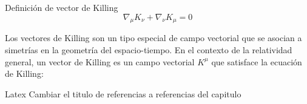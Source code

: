 \begin{definition}{Definición de vector de Killing}{}
      \begin{equation}
        \nabla_\mu K_\nu + \nabla_\nu K_\mu = 0
      \end{equation}
\end{definition}

Los vectores de Killing son un tipo especial de campo vectorial que se asocian a simetrías en la geometría del espacio-tiempo. En el contexto de la relatividad general, un vector de Killing es un campo vectorial $K^\mu$ que satisface la ecuación de Killing:







\printbibliography[keyword={BlackHoles},heading=subbibliography]

\begin{task}{Latex}{}
Cambiar el titulo de referencias a referencias del capitulo    
\end{task}
\nocite{*}